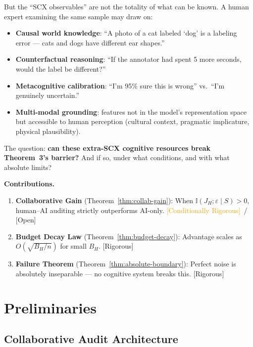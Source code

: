 \documentclass[12pt,a4paper]{article}
\newcommand{\rigorous}{\textcolor{green!50!black}{\small\textsf{[Rigorous]}}}
\newcommand{\conditionallyrigorous}{\textcolor{orange}{\small\textsf{[Conditionally Rigorous]}}}
\newcommand{\openquest}{\textcolor{red!70!black}{\small\textsf{[Open]}}}
\newcommand{\I}{\mathbb{I}}
\begin{document}
But the ``SCX observables'' are not the totality of what can be known.
A human expert examining the same sample may draw on:
\begin{itemize}
    \item \textbf{Causal world knowledge}: ``A photo of a cat labeled `dog'
          is a labeling error — cats and dogs have different ear shapes.''
    \item \textbf{Counterfactual reasoning}: ``If the annotator had spent 5
          more seconds, would the label be different?''
    \item \textbf{Metacognitive calibration}: ``I'm 95\% sure this is wrong''
          vs.\ ``I'm genuinely uncertain.''
    \item \textbf{Multi-modal grounding}: features not in the model's
          representation space but accessible to human perception (cultural
          context, pragmatic implicature, physical plausibility).
\end{itemize}

The question: \textbf{can these extra-SCX cognitive resources break
Theorem~3's barrier?}  And if so, under what conditions, and with what
absolute limits?

\medskip\noindent
\textbf{Contributions.}
\begin{enumerate}[label=(\arabic*)]
    \item \textbf{Collaborative Gain} (Theorem~\ref{thm:collab-gain}):
          When $\I(J_H; \varepsilon \mid S) > 0$, human--AI auditing strictly
          outperforms AI-only.  \conditionallyrigorous~/ \openquest
    \item \textbf{Budget Decay Law} (Theorem~\ref{thm:budget-decay}):
          Advantage scales as $O(\sqrt{B_H/n})$ for small $B_H$.  \rigorous
    \item \textbf{Failure Theorem} (Theorem~\ref{thm:absolute-boundary}):
          Perfect noise is absolutely inseparable — no cognitive system
          breaks this.  \rigorous
\end{enumerate}

\section{Preliminaries}

\subsection{Collaborative Audit Architecture}
\end{document}
